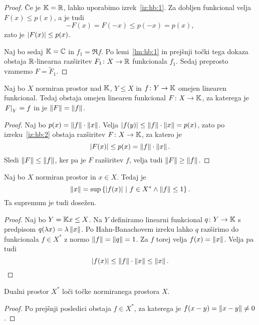 \begin{proof}
Če je $\mathbb{K} = \mathbb{R}$, lahko uporabimo izrek~\ref{iz:hb:1}. Za dobljen
funkcional velja $F(x) \leq p(x)$, a je tudi
\[
-F(x) = F(-x) \leq p(-x) = p(x),
\]
zato je $\left\lvert F(x)\right\rvert \leq p(x)$.

Naj bo sedaj $\mathbb{K} = \mathbb{C}$ in $f_1 = \Re f$. Po lemi~\ref{lm:hb:1} in
prejšnji točki tega dokaza obstaja $\mathbb{R}$-linearna razširitev
$F_1 \colon X \to \mathbb{R}$ funkcionala $f_1$. Sedaj preprosto vzamemo
$F = \widetilde{F}_1$.
\end{proof}

\begin{izrek}
Naj bo $X$ normiran prostor nad $\mathbb{K}$, $Y \leq X$ in
$f \colon Y \to \mathbb{K}$ omejen linearen funkcional. Tedaj obstaja
omejen linearen funkcional $F \colon X \to \mathbb{K}$, za katerega je
$\left. F\right|_{Y}^{} = f$ in je $\left\lVert F\right\rVert = \left\lVert f\right\rVert$.
\end{izrek}

\begin{proof}
Naj bo $p(x) = \left\lVert f\right\rVert \cdot \left\lVert x\right\rVert$. Velja
$\left\lvert f(y)\right\rvert \leq \left\lVert f\right\rVert \cdot \left\lVert x\right\rVert = p(x)$, zato po
izreku~\ref{iz:hb:2} obstaja razširitev $F \colon X \to \mathbb{K}$, za
katero je
\[
\left\lvert F(x)\right\rvert \leq p(x) = \left\lVert f\right\rVert \cdot \left\lVert x\right\rVert.
\]
Sledi $\left\lVert F\right\rVert \leq \left\lVert f\right\rVert$, ker pa je $F$ razširitev $f$, velja
tudi $\left\lVert F\right\rVert \geq \left\lVert f\right\rVert$.
\end{proof}

\begin{posledica}\label{ps:hb:1}
Naj bo $X$ normiran prostor in $x \in X$. Tedaj je
\[
\left\lVert x\right\rVert = \sup \left\{\left\lvert f(x)\right\rvert~\middle\vert~f \in X^* \land \left\lVert f\right\rVert \leq 1\right\}.
\]
Ta supremum je tudi dosežen.
\end{posledica}

\begin{proof}
Naj bo $Y = \mathbb{K} x \leq X$. Na $Y$ definiramo linearni funkcional
$q \colon Y \to \mathbb{K}$ s predpisom $q(\lambda x) = \lambda \left\lVert x\right\rVert$.
Po Hahn-Banachovem izreku lahko $q$ razširimo do funkcionala
$f \in X^*$ z normo $\left\lVert f\right\rVert = \left\lVert q\right\rVert = 1$. Za $f$ torej velja
$f(x) = \left\lVert x\right\rVert$. Velja pa tudi
\[
\left\lvert f(x)\right\rvert \leq \left\lVert f\right\rVert \cdot \left\lVert x\right\rVert \leq \left\lVert x\right\rVert. \qedhere
\]
\end{proof}

\begin{posledica}
Dualni prostor $X^*$ loči točke normiranega prostora $X$.
\end{posledica}

\begin{proof}
Po prejšnji posledici obstaja $f \in X^*$, za katerega je
$f(x-y) = \left\lVert x-y\right\rVert \ne 0$.
\end{proof}

